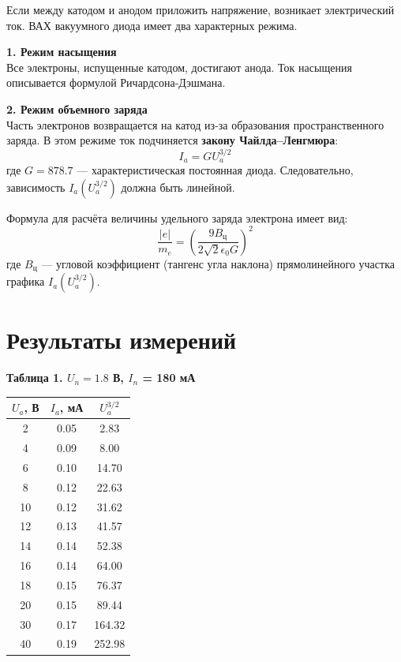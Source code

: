 \documentclass[a4paper,14pt]{extarticle}
\begin{document}
Если между катодом и анодом приложить напряжение,
возникает электрический ток. ВАХ вакуумного диода имеет два характерных режима.

\textbf{1. Режим насыщения} \\
Все электроны, испущенные катодом, достигают анода. Ток насыщения описывается формулой Ричардсона-Дэшмана.

\textbf{2. Режим объемного заряда} \\
Часть электронов возвращается на катод из-за образования пространственного заряда. В этом режиме ток подчиняется \textbf{закону Чайлда–Ленгмюра}:
\[
I_a = G U_a^{3/2}
\]
где $G = 878.7$ — характеристическая постоянная диода. 
Следовательно, зависимость $I_a(U_a^{3/2})$ должна быть линейной.

Формула для расчёта величины удельного заряда электрона имеет вид:
\[
\frac{|e|}{m_e} = \left(\frac{9 B_ц}{2 \sqrt{2} \epsilon_0 G}\right)^2
\]
где $B_ц$ — угловой коэффициент (тангенс угла наклона) прямолинейного участка графика $I_a(U_a^{3/2})$.


\section*{Результаты измерений}

\textbf{Таблица 1. $U_n = 1.8$ В, $I_n$ = 180 мА}
\begin{center}
\begin{tabular}{|c|c|c|}
\hline
$U_a$, В & $I_a$, мА & $U_a^{3/2}$ \\
\hline
2 & 0.05 & 2.83 \\
4 & 0.09 & 8.00 \\
6 & 0.10 & 14.70 \\
8 & 0.12 & 22.63 \\
10 & 0.12 & 31.62 \\
12 & 0.13 & 41.57 \\
14 & 0.14 & 52.38 \\
16 & 0.14 & 64.00 \\
18 & 0.15 & 76.37 \\
20 & 0.15 & 89.44 \\
30 & 0.17 & 164.32 \\
40 & 0.19 & 252.98 \\
\hline
\end{tabular}
\end{center}
\end{document}
